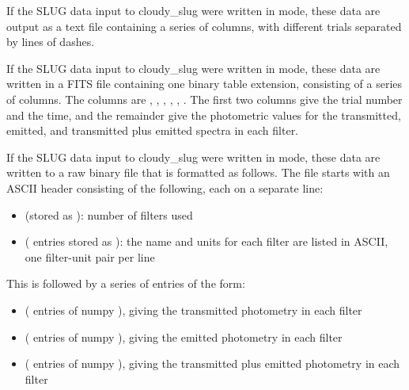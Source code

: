 \documentclass[letterpaper,10pt,english]{sphinxmanual}
\begin{document}
If the SLUG data input to cloudy\_slug were written in  mode,
these data are output as a text file containing a series of columns,
with different trials separated by lines of dashes.

If the SLUG data input to cloudy\_slug were written in  mode,
these data are written in a FITS file containing one binary table
extension, consisting of a series of columns. The columns are
, , , ,
, . The first two columns
give the trial number and the time, and the remainder give the
photometric values for the transmitted, emitted, and transmitted plus
emitted spectra in each filter.

If the SLUG data input to cloudy\_slug were written in  mode,
these data are written to a raw binary file that is formatted as
follows. The file starts with an ASCII header consisting of the
following, each on a separate line:
\begin{itemize}
\item {} 
 (stored as ): number of filters used

\item {} 
  ( entries stored as ): the name and units for each filter are listed in ASCII, one
filter-unit pair per line

\end{itemize}

This is followed by a series of entries of the form:
\begin{itemize}
\item {} 
 ( entries of numpy
), giving the transmitted photometry in each filter

\item {} 
 ( entries of numpy
), giving the emitted photometry in each filter

\item {} 
 ( entries of numpy
), giving the transmitted plus emitted photometry in each
filter

\end{itemize}
\end{document}
